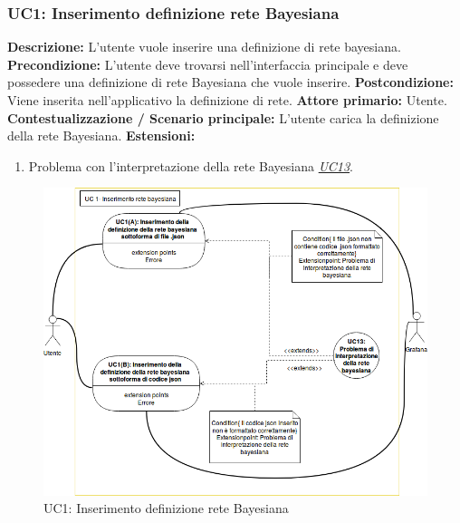 				\subsubsection{UC1: Inserimento definizione rete Bayesiana}
				    \textbf{Descrizione:} L’utente vuole inserire una definizione di rete bayesiana.\\
                    \textbf{Precondizione:} L’utente deve trovarsi nell'interfaccia principale e deve possedere una definizione di rete Bayesiana che vuole inserire.
                    \newline
                    \textbf{Postcondizione:} Viene inserita nell'applicativo la definizione di rete.
                    \newline
                    \textbf{Attore primario:} Utente.
                    \newline
                    \textbf{Contestualizzazione / Scenario principale:} L’utente carica la definizione della rete Bayesiana.
                    \newline
                    \textbf{Estensioni:} 
                    	\begin{enumerate}
                            \item Problema con l’interpretazione della rete Bayesiana \underline{\textit{UC13}}.
                        \end{enumerate}
                        
                    \begin{figure}[!htbp]
                    	\centering
                    	\includegraphics[scale=0.55]{UC1.png}
                    	\caption{UC1: Inserimento definizione rete Bayesiana}
                    	\label{uc1}
                    \end{figure}
                    \clearpage
                
